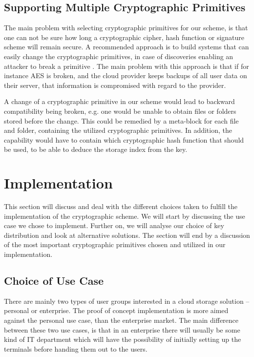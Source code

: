 \documentclass[pdftex,english,10pt,b5paper,twoside]{book}
\begin{document}
\subsection{Supporting Multiple Cryptographic Primitives} 

The main problem with selecting cryptographic primitives for our scheme, is
that one can not be sure how long a cryptographic cipher, hash function or
signature scheme will remain secure. A recommended approach is to build systems
that can easily change the cryptographic primitives, in case of discoveries
enabling an attacker to break a primitive \cite{schneier}. The main problem
with this approach is that if for instance \ac{AES} is broken, and the cloud
provider keeps backups of all user data on their server, that information is
compromised with regard to the provider.

A change of a cryptographic primitive in our scheme would lead to backward
compatibility being broken, e.g. one would be unable to obtain files or folders
stored before the change. This could be remedied by a meta-block for each file
and folder, containing the utilized cryptographic primitives. In addition, the
capability would have to contain which cryptographic hash function that should
be used, to be able to deduce the storage index from the key.

\section{Implementation}
\label{sec:DIS:impl}

This section will discuss and deal with the different choices taken to fulfill
the implementation of the cryptographic scheme. We will start by discussing the
use case we chose to implement. Further on, we will analyse our choice of key
distribution and look at alternative solutions. The section will end by a
discussion of the most important cryptographic primitives chosen and utilized
in our implementation.

\subsection{Choice of Use Case}

There are mainly two types of user groups interested in a cloud storage
solution -- personal or enterprise. The proof of concept implementation is more
aimed against the personal use case, than the enterprise market. The main
difference between these two use cases, is that in an enterprise there will
usually be some kind of IT department which will have the possibility of
initially setting up the terminals before handing them out to the users.
\end{document}
